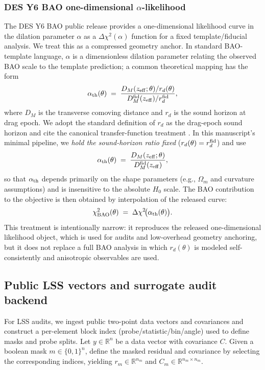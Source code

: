 \documentclass[11pt]{article}
\theoremstyle{definition}
\theoremstyle{plain}
\theoremstyle{remark}
\begin{document}
\subsubsection{DES Y6 BAO one-dimensional \texorpdfstring{$\alpha$}{alpha}-likelihood}\label{sec:methods:y6bao_like}
The DES Y6 BAO public release provides a one-dimensional likelihood curve in the dilation parameter $\alpha$ as a $\Delta\chi^2(\alpha)$ function for a fixed template/fiducial analysis.
We treat this as a compressed geometry anchor.
In standard BAO-template language, $\alpha$ is a dimensionless dilation parameter relating the observed BAO scale to the template prediction; a common theoretical mapping has the form
\begin{equation}
\alpha_{\rm th}(\theta) \;=\;
\frac{D_M(z_{\rm eff};\theta)/r_d(\theta)}{D_M^{\rm fid}(z_{\rm eff})/r_d^{\rm fid}},
\label{eq:alpha_def}
\end{equation}
where $D_M$ is the transverse comoving distance and $r_d$ is the sound horizon at drag epoch.
We adopt the standard definition of $r_d$ as the drag-epoch sound horizon and cite the canonical transfer-function treatment \cite{EisensteinHu1998Transfer}.
In this manuscript’s minimal pipeline, we \emph{hold the sound-horizon ratio fixed} ($r_d(\theta)=r_d^{\rm fid}$) and use
\begin{equation}
\alpha_{\rm th}(\theta) \;=\; \frac{D_M(z_{\rm eff};\theta)}{D_M^{\rm fid}(z_{\rm eff})},
\label{eq:alpha_th_used}
\end{equation}
so that $\alpha_{\rm th}$ depends primarily on the shape parameters (e.g., $\Omega_m$ and curvature assumptions) and is insensitive to the absolute $H_0$ scale.
The BAO contribution to the objective is then obtained by interpolation of the released curve:
\begin{equation}
\chi^2_{\rm BAO}(\theta) \;=\; \Delta\chi^2\!\big(\alpha_{\rm th}(\theta)\big).
\label{eq:bao_chi2}
\end{equation}
This treatment is intentionally narrow: it reproduces the released one-dimensional likelihood object, which is used for audits and low-overhead geometry anchoring, but it does not replace a full BAO analysis in which $r_d(\theta)$ is modeled self-consistently and anisotropic observables are used.

\subsection{Public LSS vectors and surrogate audit backend}\label{sec:methods:lss_surrogate}
For LSS audits, we ingest public two-point data vectors and covariances and construct a per-element block index (probe/statistic/bin/angle) used to define masks and probe splits.
Let $y\in\mathbb{R}^n$ be a data vector with covariance $C$.
Given a boolean mask $m\in\{0,1\}^n$, define the masked residual and covariance by selecting the corresponding indices, yielding $r_m\in\mathbb{R}^{n_m}$ and $C_m\in\mathbb{R}^{n_m\times n_m}$.
\end{document}
